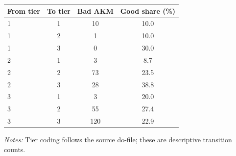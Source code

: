 \documentclass[10pt]{article}
\begin{document}
\begin{minipage}{19cm}\fontsize{10}{12}\selectfont\setlength{\tabcolsep}{4pt}\renewcommand{\arraystretch}{1.12}


\centering
{}
\begin{threeparttable}
\begin{tabular}{p{}ccc}
\toprule
From tier & To tier & Bad AKM & Good share (\%) \\
\midrule
1 & 1 & 10 & 10.0 \\
1 & 2 & 1 & 10.0 \\
1 & 3 & 0 & 30.0 \\
2 & 1 & 3 & 8.7 \\
2 & 2 & 73 & 23.5 \\
2 & 3 & 28 & 38.8 \\
3 & 1 & 3 & 20.0 \\
3 & 2 & 55 & 27.4 \\
3 & 3 & 120 & 22.9 \\
\bottomrule
\end{tabular}
\begin{tablenotes}\fontsize{9}{11}\selectfont
\item \raggedright \fontsize{9}{11}\selectfont \textit{Notes:} Tier coding follows the source do-file; these are descriptive transition counts.
\end{tablenotes}
\end{threeparttable}

\end{minipage}
\end{document}
